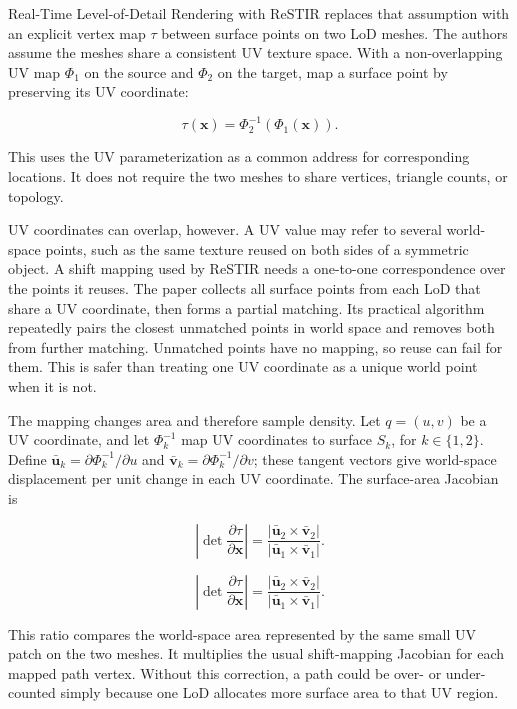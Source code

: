 Real-Time Level-of-Detail Rendering with ReSTIR replaces that assumption with an explicit vertex map \(\tau\) between surface points on two LoD meshes. The authors assume the meshes share a consistent UV texture space. With a non-overlapping UV map \(\Phi_1\) on the source and \(\Phi_2\) on the target, map a surface point by preserving its UV coordinate:

\[\tau(\mathbf{x})=\Phi_2^{-1}(\Phi_1(\mathbf{x})).\]

This uses the UV parameterization as a common address for corresponding locations. It does not require the two meshes to share vertices, triangle counts, or topology.

UV coordinates can overlap, however. A UV value may refer to several world-space points, such as the same texture reused on both sides of a symmetric object. A shift mapping used by ReSTIR needs a one-to-one correspondence over the points it reuses. The paper collects all surface points from each LoD that share a UV coordinate, then forms a partial matching. Its practical algorithm repeatedly pairs the closest unmatched points in world space and removes both from further matching. Unmatched points have no mapping, so reuse can fail for them. This is safer than treating one UV coordinate as a unique world point when it is not.

The mapping changes area and therefore sample density. Let \(q=(u,v)\) be a UV coordinate, and let \(\Phi_k^{-1}\) map UV coordinates to surface \(S_k\), for \(k\in\{1,2\}\). Define \(\bar{\mathbf{u}}_k=\partial\Phi_k^{-1}/\partial u\) and \(\bar{\mathbf{v}}_k=\partial\Phi_k^{-1}/\partial v\); these tangent vectors give world-space displacement per unit change in each UV coordinate. The surface-area Jacobian is

\[\left|\det\frac{\partial\tau}{\partial\mathbf{x}}\right|=\frac{|\bar{\mathbf{u}}_2\times\bar{\mathbf{v}}_2|}{|\bar{\mathbf{u}}_1\times\bar{\mathbf{v}}_1|}.\]

\[\left|\det\frac{\partial\tau}{\partial\mathbf{x}}\right|=\frac{|\bar{\mathbf{u}}_2\times\bar{\mathbf{v}}_2|}{|\bar{\mathbf{u}}_1\times\bar{\mathbf{v}}_1|}.\]

This ratio compares the world-space area represented by the same small UV patch on the two meshes. It multiplies the usual shift-mapping Jacobian for each mapped path vertex. Without this correction, a path could be over- or under-counted simply because one LoD allocates more surface area to that UV region.

